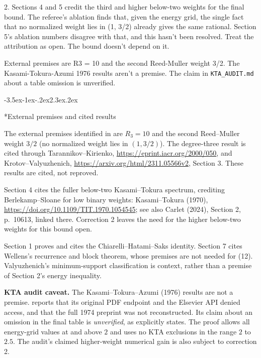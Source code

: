 \documentclass[11pt]{article}
\makeatletter
\renewcommand\section{\@startsection{section}{1}{\z@}
  {-3.5ex\@plus -1ex\@minus -.2ex}{2.3ex\@plus .2ex}
  {\normalfont\Large\bfseries\raggedright}}
\theoremstyle{remark}
\theoremstyle{correctionstyle}
\makeatother
\begin{document}
2. Sections 4 and 5 credit the third and higher below-two weights for the final bound. The referee's ablation finds that, given the energy grid, the single fact that no normalized weight lies in (1, 3/2) already gives the same rational. Section 5's ablation numbers disagree with that, and this hasn't been resolved. Treat the attribution as open. The bound doesn't depend on it.\par

External premises are R3 = 10 and the second Reed-Muller weight 3/2. The Kasami-Tokura-Azumi 1976 results aren't a premise. The claim in \texttt{KTA\_AUDIT.md} about a table omission is unverified.\par


\section*{External premises and cited results}
\label{premises}
The external premises identified in  are $R_3=10$
and the second Reed--Muller weight $3/2$ (no normalized weight lies in
$(1,3/2)$). The degree-three result is cited through Tarannikov--Kirienko,
\url{https://eprint.iacr.org/2000/050}, and Krotov--Valyuzhenich,
\url{https://arxiv.org/html/2311.05566v2}, Section 3. These results are
cited, not reproved.

Section 4 cites the fuller below-two Kasami--Tokura spectrum, crediting
Berlekamp--Sloane for low binary weights: Kasami--Tokura (1970),
\url{https://doi.org/10.1109/TIT.1970.1054545}; see also Carlet (2024),
Section 2, p.~10613, linked there. Correction 2 leaves the need for the
higher below-two weights for this bound open.

Section 1 proves and cites the Chiarelli--Hatami--Saks identity. Section 7
cites Wellens's recurrence and block theorem, whose premises are not needed
for (12). Valyuzhenich's minimum-support classification is context, rather
than a premise of Section 2's energy inequality.

\textbf{KTA audit caveat.} The Kasami--Tokura--Azumi (1976) results are not
a premise.  reports that its original PDF endpoint and
the Elsevier API denied access, and that the full 1974 preprint was not
reconstructed. Its claim about an omission in the final table is
\emph{unverified}, as  explicitly states. The proof
allows all energy-grid values at and above $2$ and uses no KTA exclusions
in the range $2$ to $2.5$. The audit's claimed higher-weight numerical gain
is also subject to correction 2.
\end{document}

